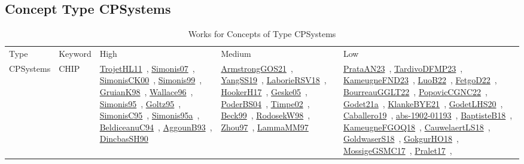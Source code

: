\clearpage
\subsection{Concept Type CPSystems}
\label{sec:CPSystems}
{\scriptsize
\begin{longtable}{lp{3cm}>{\raggedright\arraybackslash}p{6cm}>{\raggedright\arraybackslash}p{6cm}>{\raggedright\arraybackslash}p{8cm}}
\rowcolor{white}\caption{Works for Concepts of Type CPSystems}\\ \toprule
\rowcolor{white}Type & Keyword & High & Medium & Low\\ \midrule\endhead
\bottomrule
\endfoot
CPSystems & CHIP & \href{works/TrojetHL11.pdf}{TrojetHL11}~\cite{TrojetHL11}, \href{works/Simonis07.pdf}{Simonis07}~\cite{Simonis07}, \href{works/SimonisCK00.pdf}{SimonisCK00}~\cite{SimonisCK00}, \href{works/Simonis99.pdf}{Simonis99}~\cite{Simonis99}, \href{works/GruianK98.pdf}{GruianK98}~\cite{GruianK98}, \href{works/Wallace96.pdf}{Wallace96}~\cite{Wallace96}, \href{works/Simonis95.pdf}{Simonis95}~\cite{Simonis95}, \href{works/Goltz95.pdf}{Goltz95}~\cite{Goltz95}, \href{works/SimonisC95.pdf}{SimonisC95}~\cite{SimonisC95}, \href{works/Simonis95a.pdf}{Simonis95a}~\cite{Simonis95a}, \href{works/BeldiceanuC94.pdf}{BeldiceanuC94}~\cite{BeldiceanuC94}, \href{works/AggounB93.pdf}{AggounB93}~\cite{AggounB93}, \href{works/DincbasSH90.pdf}{DincbasSH90}~\cite{DincbasSH90} & \href{works/ArmstrongGOS21.pdf}{ArmstrongGOS21}~\cite{ArmstrongGOS21}, \href{works/YangSS19.pdf}{YangSS19}~\cite{YangSS19}, \href{works/LaborieRSV18.pdf}{LaborieRSV18}~\cite{LaborieRSV18}, \href{works/HookerH17.pdf}{HookerH17}~\cite{HookerH17}, \href{works/Geske05.pdf}{Geske05}~\cite{Geske05}, \href{works/PoderBS04.pdf}{PoderBS04}~\cite{PoderBS04}, \href{works/Timpe02.pdf}{Timpe02}~\cite{Timpe02}, \href{works/Beck99.pdf}{Beck99}~\cite{Beck99}, \href{works/RodosekW98.pdf}{RodosekW98}~\cite{RodosekW98}, \href{works/Zhou97.pdf}{Zhou97}~\cite{Zhou97}, \href{works/LammaMM97.pdf}{LammaMM97}~\cite{LammaMM97} & \href{works/PrataAN23.pdf}{PrataAN23}~\cite{PrataAN23}, \href{works/TardivoDFMP23.pdf}{TardivoDFMP23}~\cite{TardivoDFMP23}, \href{works/KameugneFND23.pdf}{KameugneFND23}~\cite{KameugneFND23}, \href{works/LuoB22.pdf}{LuoB22}~\cite{LuoB22}, \href{works/FetgoD22.pdf}{FetgoD22}~\cite{FetgoD22}, \href{works/BourreauGGLT22.pdf}{BourreauGGLT22}~\cite{BourreauGGLT22}, \href{works/PopovicCGNC22.pdf}{PopovicCGNC22}~\cite{PopovicCGNC22}, \href{works/Godet21a.pdf}{Godet21a}~\cite{Godet21a}, \href{works/KlankeBYE21.pdf}{KlankeBYE21}~\cite{KlankeBYE21}, \href{works/GodetLHS20.pdf}{GodetLHS20}~\cite{GodetLHS20}, \href{works/Caballero19.pdf}{Caballero19}~\cite{Caballero19}, \href{works/abs-1902-01193.pdf}{abs-1902-01193}~\cite{abs-1902-01193}, \href{works/BaptisteB18.pdf}{BaptisteB18}~\cite{BaptisteB18}, \href{works/KameugneFGOQ18.pdf}{KameugneFGOQ18}~\cite{KameugneFGOQ18}, \href{works/CauwelaertLS18.pdf}{CauwelaertLS18}~\cite{CauwelaertLS18}, \href{works/GoldwaserS18.pdf}{GoldwaserS18}~\cite{GoldwaserS18}, \href{works/GokgurHO18.pdf}{GokgurHO18}~\cite{GokgurHO18}, \href{works/MossigeGSMC17.pdf}{MossigeGSMC17}~\cite{MossigeGSMC17}, \href{works/Pralet17.pdf}{Pralet17}~\cite{Pralet17}, 
\end{longtable}}
